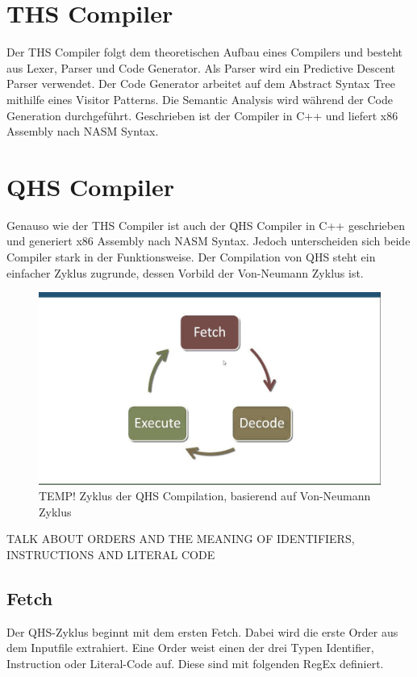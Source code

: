 \chapter{THS Compiler}
Der THS Compiler folgt dem theoretischen Aufbau eines Compilers und besteht aus Lexer, Parser und Code Generator. Als Parser wird ein Predictive Descent Parser verwendet.
Der Code Generator arbeitet auf dem Abstract Syntax Tree mithilfe eines Visitor Patterns. Die Semantic Analysis wird während der Code Generation durchgeführt. Geschrieben ist der Compiler in C++ und liefert x86 Assembly nach NASM Syntax.

\chapter{QHS Compiler}
Genauso wie der THS Compiler ist auch der QHS Compiler in C++ geschrieben und generiert x86 Assembly nach NASM Syntax.
Jedoch unterscheiden sich beide Compiler stark in der Funktionsweise. Der Compilation von QHS steht ein einfacher Zyklus zugrunde, dessen Vorbild der Von-Neumann Zyklus ist.

\begin{figure}[h!]
    \centering
    \includegraphics[scale=0.3]{resources/TEMP_von-neumann-cycle.jpg}
    \caption{TEMP! Zyklus der QHS Compilation, basierend auf Von-Neumann Zyklus}
    \label{fig:von-neumann-cycle}
\end{figure}

TALK ABOUT ORDERS AND THE MEANING OF IDENTIFIERS, INSTRUCTIONS AND LITERAL CODE

\section{Fetch} \label{sec:qhs-fetch}
Der QHS-Zyklus beginnt mit dem ersten Fetch. Dabei wird die erste Order aus dem Inputfile extrahiert. Eine Order weist einen der drei Typen Identifier, Instruction oder Literal-Code auf. Diese sind mit folgenden RegEx definiert.

